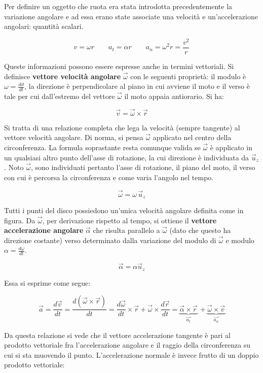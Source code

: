 Per definire un oggetto che ruota era stata introdotta precedentemente la variazione angolare e ad essa erano state associate una velocità e un'accelerazione angolari: quantità scalari.

\[
	v=\omega r \qquad a_t=\alpha r \qquad a_n=\omega^2 r=\frac{v^2}{r}
\]

Queste informazioni possono essere espresse anche in termini vettoriali. Si definisce \textbf{vettore velocità angolare} $\vec{\omega}$ con le seguenti proprietà: il modulo è $\omega=\frac{d\vartheta}{dt}$, la direzione è perpendicolare al piano in cui avviene il moto e il verso è tale per cui dall'estremo del vettore $\vec{\omega}$ il moto appaia antiorario. Si ha:

\[
	\vec{v}=\vec{\omega} \times \vec{r}
\]

Si tratta di una relazione completa che lega la velocità (sempre tangente) al vettore velocità angolare. Di norma, si pensa $\vec{\omega}$ applicato nel centro della circonferenza. La formula soprastante resta comunque valida se $\vec{\omega}$ è applicato in un qualsiasi altro punto dell'asse di rotazione, la cui direzione è individuata da $\vec{u}_z$. Noto $\vec{\omega}$, sono individuati pertanto l'asse di rotazione, il piano del moto, il verso con cui è percorsa la circonferenza e come varia l'angolo nel tempo.

\[
	\vec{\omega}=\omega\, \vec{u}_z
\]

Tutti i punti del disco possiedono un'unica velocità angolare definita come in figura. Da $\vec{\omega}$, per derivazione rispetto al tempo, si ottiene il \textbf{vettore accelerazione angolare} $\vec{\alpha}$ che risulta parallelo a $\vec{\omega}$ (dato che questo ha direzione costante) verso determinato dalla variazione del modulo di $\vec{\omega}$ e modulo $\alpha=\frac{d\omega}{dt}$.

\[
	\vec{\alpha}=\alpha \vec{u}_z
\]

Essa si esprime come segue:

\[
	\vec{a}=\frac{d\vec{v}}{dt}=\frac{d(\vec{\omega} \times \vec{r})}{dt}=\frac{d\vec{\omega}}{dt} \times \vec{r}+\vec{\omega} \times \frac{d\vec{r}}{dt}=\underbrace{\vec{\alpha} \times \vec{r}}_{\vec{a_t}}\, + \underbrace{\vec{\omega} \times \vec{v}}_{\vec{a_n}}
\]

Da questa relazione si vede che il vettore accelerazione tangente è pari al prodotto vettoriale fra l'accelerazione angolare e il raggio della circonferenza su cui si sta muovendo il punto. L'accelerazione normale è invece frutto di un doppio prodotto vettoriale:

